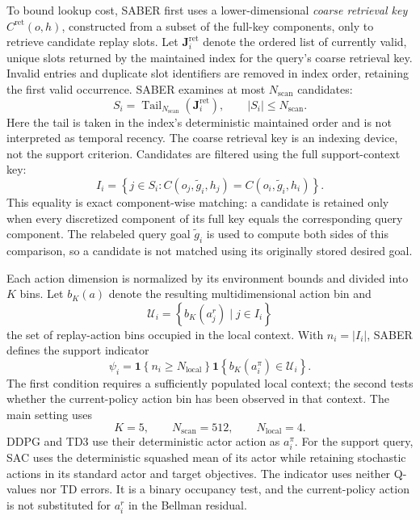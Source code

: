 \documentclass[letterpaper]{article}
\begin{document}
To bound lookup cost, SABER first uses a lower-dimensional
\emph{coarse retrieval key} \(C^{\mathrm{ret}}(o,h)\), constructed
from a subset of the full-key components, only to retrieve candidate
replay slots. Let \(\mathbf J_i^{\mathrm{ret}}\) denote the ordered
list of currently valid, unique slots returned by the maintained index
for the query's coarse retrieval key. Invalid entries and duplicate
slot identifiers are removed in index order, retaining the first valid
occurrence. SABER examines at most \(N_{\mathrm{scan}}\) candidates:
\begin{equation}
S_i=
\operatorname{Tail}_{N_{\mathrm{scan}}}
\left(\mathbf J_i^{\mathrm{ret}}\right),
\qquad |S_i|\leq N_{\mathrm{scan}}.
\end{equation}
Here the tail is taken in the index's deterministic maintained order
and is not interpreted as temporal recency.
The coarse retrieval key is an indexing device, not the support
criterion.  Candidates are filtered using the full support-context
key:
\begin{equation}
I_i=
\left\{
j\in S_i:
C(o_j,\tilde g_i,h_j)
=C(o_i,\tilde g_i,h_i)
\right\}.
\end{equation}
This equality is exact component-wise matching: a candidate is
retained only when every discretized component of its full key equals
the corresponding query component.  The relabeled query goal
\(\tilde g_i\) is used to compute both sides of this comparison, so a
candidate is not matched using its originally stored desired goal.

Each action dimension is normalized by its environment bounds and
divided into \(K\) bins.  Let \(b_K(a)\) denote the resulting
multidimensional action bin and
\begin{equation}
\mathcal U_i=
\left\{
b_K(a_j^r)\mid j\in I_i
\right\}
\end{equation}
the set of replay-action bins occupied in the local context.  With
\(n_i=|I_i|\), SABER defines the support indicator
\begin{equation}
\psi_i=
\mathbf 1\!\left\{n_i\geq N_{\mathrm{local}}\right\}
\mathbf 1\!\left\{b_K(a_i^\pi)\in\mathcal U_i\right\}.
\end{equation}
The first condition requires a sufficiently populated local context;
the second tests whether the current-policy action bin has
been observed in that context.  The main setting uses
\begin{equation}
K=5,\qquad N_{\mathrm{scan}}=512,\qquad
N_{\mathrm{local}}=4.
\end{equation}
DDPG and TD3 use their deterministic actor action as \(a_i^\pi\).
For the support query, SAC uses the deterministic squashed mean of its
actor while retaining stochastic actions in its standard actor and
target objectives.  The indicator uses neither Q-values nor TD
errors.  It is a binary occupancy test, and the current-policy action
is not substituted for \(a_i^r\) in the Bellman residual.
\end{document}
